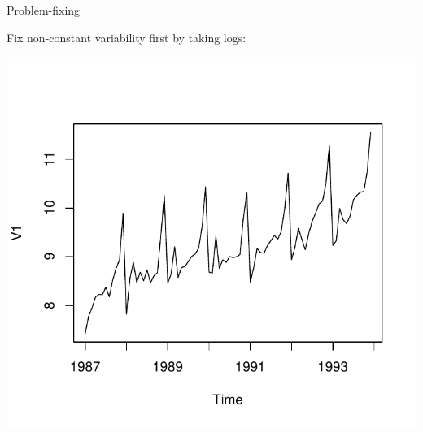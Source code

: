 \begin{frame}[fragile]{Problem-fixing}
  
Fix non-constant variability first by taking logs:

\begin{knitrout}
\color{fgcolor}\begin{kframe}
\begin{alltt}
\hlkwb{=}
\end{alltt}
\end{kframe}
\includegraphics[width=\maxwidth]{figure/lupomartini-1} 

\end{knitrout}
  
\end{frame}

